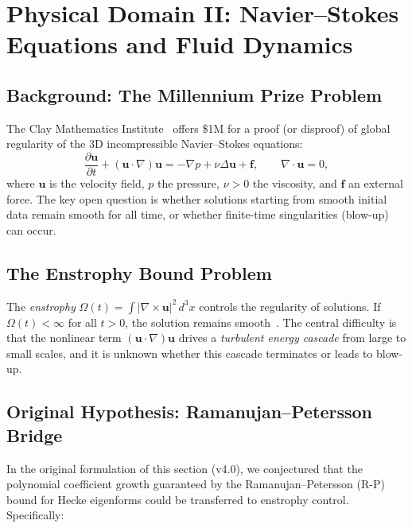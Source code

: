 \section{Physical Domain II: Navier--Stokes Equations and Fluid Dynamics}
\label{sec:navier_stokes}

\subsection{Background: The Millennium Prize Problem}

The Clay Mathematics Institute~\cite{clay_navier_stokes} offers \$1M for a proof (or disproof) of global regularity of the 3D incompressible Navier--Stokes equations:
\begin{equation}
  \label{eq:navier_stokes}
  \frac{\partial \mathbf{u}}{\partial t} + (\mathbf{u} \cdot \nabla)\mathbf{u} = -\nabla p + \nu \Delta \mathbf{u} + \mathbf{f}, \qquad \nabla \cdot \mathbf{u} = 0,
\end{equation}
where $\mathbf{u}$ is the velocity field, $p$ the pressure, $\nu > 0$ the viscosity, and $\mathbf{f}$ an external force. The key open question is whether solutions starting from smooth initial data remain smooth for all time, or whether finite-time singularities (blow-up) can occur.

\subsection{The Enstrophy Bound Problem}

The \emph{enstrophy} $\Omega(t) = \int |\nabla \times \mathbf{u}|^2 \, d^3x$ controls the regularity of solutions. If $\Omega(t) < \infty$ for all $t > 0$, the solution remains smooth~\cite{clay_navier_stokes}. The central difficulty is that the nonlinear term $(\mathbf{u}\cdot\nabla)\mathbf{u}$ drives a \emph{turbulent energy cascade} from large to small scales, and it is unknown whether this cascade terminates or leads to blow-up.

\subsection{Original Hypothesis: Ramanujan--Petersson Bridge}

In the original formulation of this section (v4.0), we conjectured that the polynomial coefficient growth guaranteed by the Ramanujan--Petersson (R-P) bound for Hecke eigenforms could be transferred to enstrophy control. Specifically:

